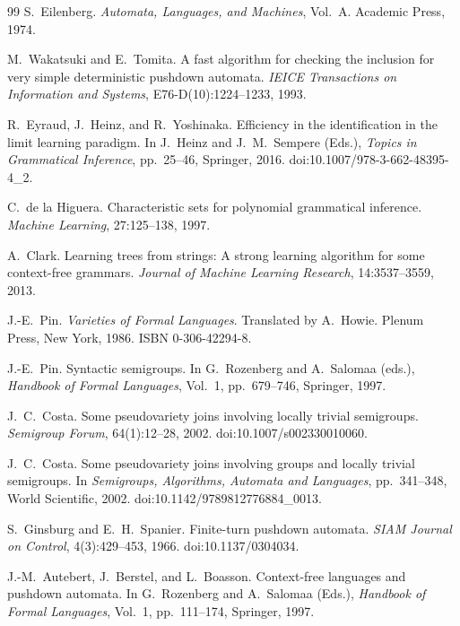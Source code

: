 \documentclass[11pt,a4paper]{ltjsarticle}
\theoremstyle{remark}
\theoremstyle{plain}
\begin{document}
\begin{thebibliography}{99}
S.~Eilenberg.
\newblock \emph{Automata, Languages, and Machines}, Vol.~A.
\newblock Academic Press, 1974.

M.~Wakatsuki and E.~Tomita.
\newblock A fast algorithm for checking the inclusion for very simple
deterministic pushdown automata.
\newblock \textit{IEICE Transactions on Information and Systems},
E76-D(10):1224--1233, 1993.

R.~Eyraud, J.~Heinz, and R.~Yoshinaka.
\newblock Efficiency in the identification in the limit learning paradigm.
\newblock In J.~Heinz and J.~M.~Sempere (Eds.),
\emph{Topics in Grammatical Inference}, pp.~25--46, Springer, 2016.
doi:10.1007/978-3-662-48395-4\_2.

C.~de la Higuera.
Characteristic sets for polynomial grammatical inference.
\textit{Machine Learning}, 27:125--138, 1997.

A.~Clark.
\newblock Learning trees from strings: A strong learning algorithm for some context-free grammars.
\newblock \textit{Journal of Machine Learning Research}, 14:3537--3559, 2013.

J.-E.~Pin.
\newblock \emph{Varieties of Formal Languages}.
\newblock Translated by A.~Howie.
\newblock Plenum Press, New York, 1986.
\newblock ISBN 0-306-42294-8.

J.-E.~Pin.
\newblock Syntactic semigroups.
\newblock In G.~Rozenberg and A.~Salomaa (eds.),
\textit{Handbook of Formal Languages}, Vol.~1, pp.~679--746,
Springer, 1997.

J.~C.~Costa.
\newblock Some pseudovariety joins involving locally trivial semigroups.
\newblock \textit{Semigroup Forum}, 64(1):12--28, 2002.
\newblock doi:10.1007/s002330010060.

J.~C.~Costa.
\newblock Some pseudovariety joins involving groups and locally trivial semigroups.
\newblock In \textit{Semigroups, Algorithms, Automata and Languages},
pp.~341--348, World Scientific, 2002.
\newblock doi:10.1142/9789812776884\_0013.

S.~Ginsburg and E.~H.~Spanier.
\newblock Finite-turn pushdown automata.
\newblock \textit{SIAM Journal on Control}, 4(3):429--453, 1966.
doi:10.1137/0304034.

J.-M.~Autebert, J.~Berstel, and L.~Boasson.
\newblock Context-free languages and pushdown automata.
\newblock In G.~Rozenberg and A.~Salomaa (Eds.),
\emph{Handbook of Formal Languages}, Vol.~1, pp.~111--174,
Springer, 1997.


\end{thebibliography}
\end{document}
